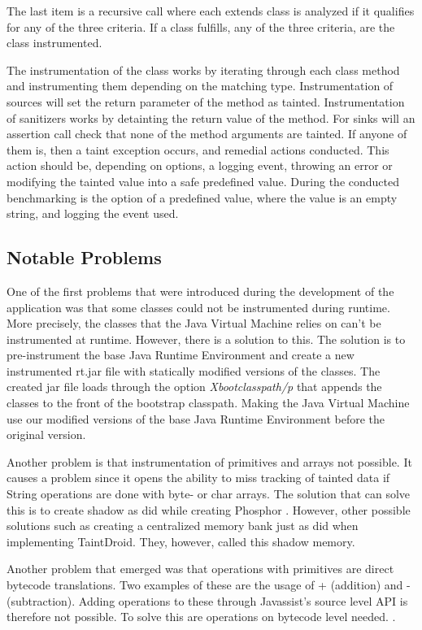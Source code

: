 The last item is a recursive call where each extends class is analyzed if it qualifies for any of the three criteria. If a class fulfills, any of the three criteria, are the class instrumented.

The instrumentation of the class works by iterating through each class method and instrumenting them depending on the matching type. Instrumentation of sources will set the return parameter of the method as tainted. Instrumentation of sanitizers works by detainting the return value of the method. For sinks will an assertion call check that none of the method arguments are tainted. If anyone of them is, then a taint exception occurs, and remedial actions conducted. This action should be, depending on options, a logging event, throwing an error or modifying the tainted value into a safe predefined value. During the conducted benchmarking is the option of a predefined value, where the value is an empty string, and logging the event used.



\subsection{Notable Problems}
\label{NotableProblems}
One of the first problems that were introduced during the development of the application was that some classes could not be instrumented during runtime. More precisely, the classes that the Java Virtual Machine relies on can't be instrumented at runtime. However, there is a solution to this. The solution is to pre-instrument the base Java Runtime Environment and create a new instrumented rt.jar file with statically modified versions of the classes. The created jar file loads through the option \textit{Xbootclasspath/p} that appends the classes to the front of the bootstrap classpath. Making the Java Virtual Machine use our modified versions of the base Java Runtime Environment \parencite{xboot} before the original version.

Another problem is that instrumentation of primitives and arrays not possible. It causes a problem since it opens the ability to miss tracking of tainted data if String operations are done with byte- or char arrays. The solution that can solve this is to create shadow as \textcite{BellJ.2014PIdd} did while creating Phosphor \parencite{phosphor}. However, other possible solutions such as creating a centralized memory bank just as \textcite{EnckWilliam2014Taif} did when implementing TaintDroid. They, however, called this shadow memory.

Another problem that emerged was that operations with primitives are direct bytecode translations. Two examples of these are the usage of + (addition) and - (subtraction). Adding operations to these through Javassist's source level API is therefore not possible. To solve this are operations on bytecode level needed. \parencite{Javassist}.